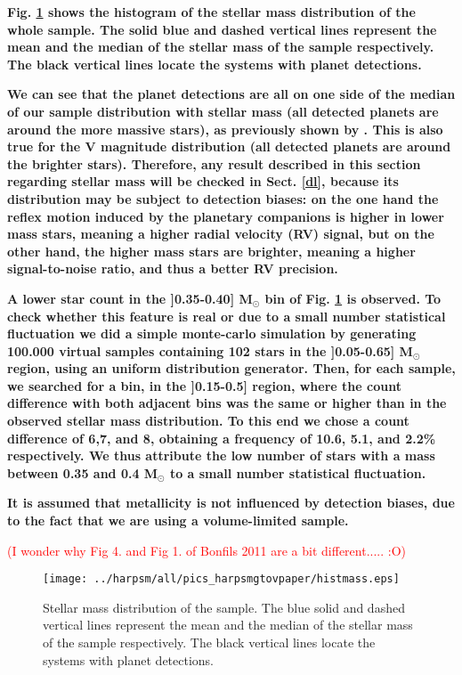 \documentclass[structabstract]{aa}
\begin{document}
\textbf{Fig. \ref{histmass} shows the histogram of the stellar mass distribution of the whole sample. The solid blue and dashed vertical lines represent the mean and the median of the stellar mass of the sample respectively. The black vertical lines locate the systems with planet detections. }

\textbf{We can see that the planet detections are all on one side of the median of our sample distribution with stellar mass (all detected planets are around the more massive stars), as previously shown by \cite{Bonfils-2011}. This is also true for the V magnitude distribution (all detected planets are around the brighter stars). Therefore, any result described in this section regarding stellar mass will be checked in Sect. \ref{dl}, because its distribution may be subject to detection biases: on the one hand the reflex motion induced by the planetary companions is higher in lower mass stars, meaning a higher radial velocity (RV) signal, but on the other hand, the higher mass stars are brighter, meaning a higher signal-to-noise ratio, and thus a better RV precision.}

\textbf{A lower star count in the ]0.35-0.40] M$_{\odot}$ bin of Fig. \ref{histmass} is observed. To check whether this feature is real or due to a small number statistical fluctuation we did a simple monte-carlo simulation by generating 100.000 virtual samples containing 102 stars in the ]0.05-0.65]  M$_{\odot}$  region, using an uniform distribution generator. Then, for each sample, we searched for a bin, in the ]0.15-0.5] region, where the count difference with both adjacent bins was the same or higher than in the observed stellar mass distribution. To this end we chose a count difference of 6,7, and 8, obtaining a frequency of 10.6, 5.1, and 2.2\% respectively. We thus attribute the low number of stars with a mass between 0.35 and 0.4 M$_{\odot}$ to a small number statistical fluctuation.} 

\textbf{It is assumed that metallicity is not influenced by detection biases, due to the fact that we are using a volume-limited sample.} 

\textcolor{red}{(I wonder why Fig 4. and Fig 1. of Bonfils 2011 are a bit different..... :O)}

\begin{figure}[h]
\begin{center}
\texttt{[image: ../harpsm/all/pics\_harpsmgtovpaper/histmass.eps]}
\end{center}
\caption{Stellar mass distribution of the sample. The blue solid and dashed vertical lines represent the mean and the median of the stellar mass of the sample respectively. The black vertical lines locate the systems with planet detections.}
\label{histmass}
\end{figure}
\end{document}
